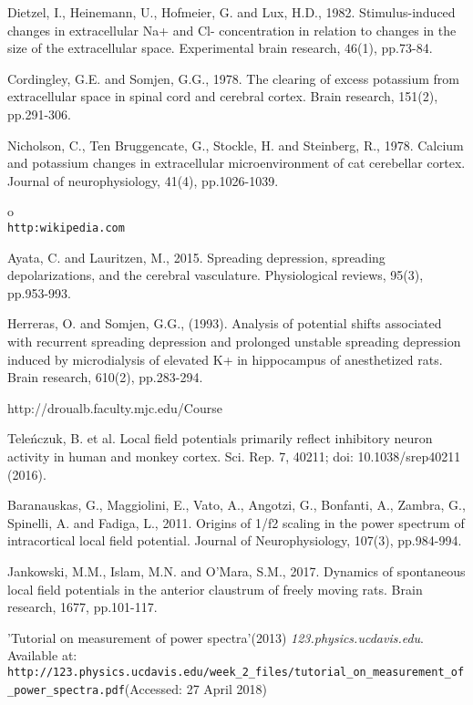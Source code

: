\documentclass{article}
\begin{document}
\begin{thebibliography}{1}
Dietzel, I., Heinemann, U., Hofmeier, G. and Lux, H.D., 1982. Stimulus-induced changes in extracellular Na+ and Cl- concentration in relation to changes in the size of the extracellular space. Experimental brain research, 46(1), pp.73-84.

Cordingley, G.E. and Somjen, G.G., 1978. The clearing of excess potassium from extracellular space in spinal cord and cerebral cortex. Brain research, 151(2), pp.291-306.

Nicholson, C., Ten Bruggencate, G., Stockle, H. and Steinberg, R., 1978. Calcium and potassium changes in extracellular microenvironment of cat cerebellar cortex. Journal of neurophysiology, 41(4), pp.1026-1039.

o
\\\texttt{http:wikipedia.com}

Ayata, C. and Lauritzen, M., 2015. Spreading depression, spreading depolarizations, and the cerebral vasculature. Physiological reviews, 95(3), pp.953-993.

Herreras, O. and Somjen, G.G., (1993). Analysis of potential shifts associated with recurrent spreading depression and prolonged unstable spreading depression induced by microdialysis of elevated K+ in hippocampus of anesthetized rats. Brain research, 610(2), pp.283-294.

http://droualb.faculty.mjc.edu/Course%

 Teleńczuk, B. et al. Local field potentials primarily reflect inhibitory neuron activity in human and monkey cortex. Sci. Rep. 7, 40211; doi: 10.1038/srep40211 (2016).

Baranauskas, G., Maggiolini, E., Vato, A., Angotzi, G., Bonfanti, A., Zambra, G., Spinelli, A. and Fadiga, L., 2011. Origins of 1/f2 scaling in the power spectrum of intracortical local field potential. Journal of Neurophysiology, 107(3), pp.984-994.

Jankowski, M.M., Islam, M.N. and O'Mara, S.M., 2017. Dynamics of spontaneous local field potentials in the anterior claustrum of freely moving rats. Brain research, 1677, pp.101-117.

'Tutorial on measurement of power spectra'(2013) \textit{123.physics.ucdavis.edu}. Available at:
\\\texttt{http://123.physics.ucdavis.edu/week\_2\_files/tutorial\_on\_measurement\_of\_power\_spectra.pdf}(Accessed: 27 April 2018)


\end{thebibliography}
\end{document}
